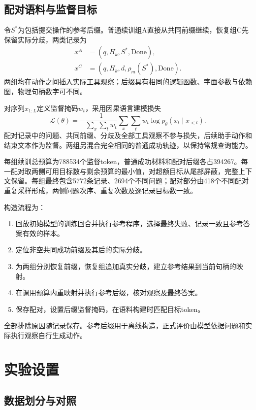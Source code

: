 

\subsection{配对语料与监督目标}

令$S^*$为包括提交操作的参考后缀。普通续训组A直接从共同前缀继续，恢复组C先保留实际分歧，两类记录为
\begin{align}
 x^A&=(q,H_k,S^*,\mathrm{Done}),\\
 x^C&=(q,H_k,d,\rho_m(S^*),\mathrm{Done}).
\end{align}
两组均在动作之间插入实际工具观察；后缀具有相同的逻辑函数、字面参数与依赖图，物理句柄数字可不同。

对序列$x_{1:L}$定义监督掩码$w_t$，采用因果语言建模损失
\begin{equation}
 \mathcal L(\theta)=-\frac{1}{\sum_x\sum_t w_t}
 \sum_x\sum_t w_t\log p_\theta(x_t\mid x_{<t}).
\end{equation}
配对记录中的问题、共同前缀、分歧及全部工具观察不参与损失，后续助手动作和结束文本作为监督。两组另混合完全相同的普通成功轨迹，以保持常规查询能力。

每组续训总预算为788534个监督token，普通成功材料和配对后缀各占394267。每一配对取两侧可用目标数与剩余预算的最小值，对超额目标从尾部屏蔽，完整上下文保留。每组最终包含5772条记录、2694个不同问题；配对部分由418个不同配对重复采样形成，两侧问题次序、重复次数及逐记录目标数一致。

构造流程为：
\begin{enumerate}
\item 回放初始模型的训练回合并执行参考程序，选择最终失败、记录一致且参考答案有效的样本。
\item 定位非空共同成功前缀及其后的实际分歧。
\item 为两组分别恢复前缀，恢复组追加真实分歧，建立参考结果到当前句柄的映射。
\item 在调用预算内重映射并执行参考后缀，核对观察及最终答案。
\item 保存配对，设置后缀监督掩码，在语料构建时匹配目标token。
\end{enumerate}
全部排除原因随记录保存。参考后缀用于离线构造，正式评价由模型依据问题和实际执行观察自行生成动作。

\section{实验设置}

\subsection{数据划分与对照}

